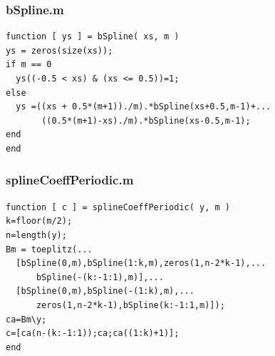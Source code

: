 \documentclass[ngerman,12pt]{article}
\begin{document}
\lstset{language=Matlab,basicstyle=\ttfamily,columns=fixed}
\subsubsection*{bSpline.m}
\begin{lstlisting}[frame=single]
function [ ys ] = bSpline( xs, m )
ys = zeros(size(xs));
if m == 0
  ys((-0.5 < xs) & (xs <= 0.5))=1;
else
  ys =((xs + 0.5*(m+1))./m).*bSpline(xs+0.5,m-1)+...
       ((0.5*(m+1)-xs)./m).*bSpline(xs-0.5,m-1);
end
end
\end{lstlisting}

\subsubsection*{splineCoeffPeriodic.m}
\begin{lstlisting}[frame=single]
function [ c ] = splineCoeffPeriodic( y, m )
k=floor(m/2);
n=length(y);
Bm = toeplitz(...
  [bSpline(0,m),bSpline(1:k,m),zeros(1,n-2*k-1),...
      bSpline(-(k:-1:1),m)],...
  [bSpline(0,m),bSpline(-(1:k),m),...
      zeros(1,n-2*k-1),bSpline(k:-1:1,m)]);
ca=Bm\y;
c=[ca(n-(k:-1:1));ca;ca((1:k)+1)];
end
\end{lstlisting}
\end{document}

